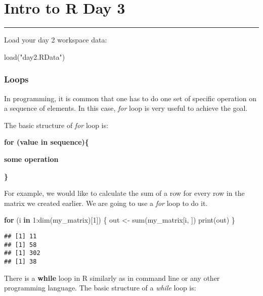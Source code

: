 \documentclass[
]{article}
\author{}
\date{\vspace{-2.5em}}
\newenvironment{Shaded}{\begin{snugshade}}{\end{snugshade}}
\newcommand{\ControlFlowTok}[1]{\textcolor[rgb]{0.13,0.29,0.53}{\textbf{#1}}}
\newcommand{\DecValTok}[1]{\textcolor[rgb]{0.00,0.00,0.81}{#1}}
\newcommand{\FunctionTok}[1]{\textcolor[rgb]{0.00,0.00,0.00}{#1}}
\newcommand{\NormalTok}[1]{#1}
\newcommand{\OtherTok}[1]{\textcolor[rgb]{0.56,0.35,0.01}{#1}}
\newcommand{\SpecialCharTok}[1]{\textcolor[rgb]{0.00,0.00,0.00}{#1}}
\newcommand{\StringTok}[1]{\textcolor[rgb]{0.31,0.60,0.02}{#1}}
\begin{document}
\hypertarget{intro-to-r-day-3}{%
\section{Intro to R Day 3}\label{intro-to-r-day-3}}

\begin{center}\rule{0.5\linewidth}{0.5pt}\end{center}

Load your day 2 workspace data:

\begin{Shaded}
\begin{Highlighting}[]
\FunctionTok{load}\NormalTok{(}\StringTok{"day2.RData"}\NormalTok{)}
\end{Highlighting}
\end{Shaded}

\hypertarget{loops}{%
\subsubsection{Loops}\label{loops}}

In programming, it is common that one has to do one set of specific
operation on a sequence of elements. In this case, \emph{for} loop is
very useful to achieve the goal.

The basic structure of \emph{for} loop is:

\textbf{for (value in sequence)\{}

\textbf{some operation}

\textbf{\}}

For example, we would like to calculate the sum of a row for every row
in the matrix we created earlier. We are going to use a \emph{for} loop
to do it.

\begin{Shaded}
\begin{Highlighting}[]
\ControlFlowTok{for}\NormalTok{ (i }\ControlFlowTok{in} \DecValTok{1}\SpecialCharTok{:}\FunctionTok{dim}\NormalTok{(my\_matrix)[}\DecValTok{1}\NormalTok{]) \{}
\NormalTok{  out }\OtherTok{\textless{}{-}} \FunctionTok{sum}\NormalTok{(my\_matrix[i, ])}
  \FunctionTok{print}\NormalTok{(out)}
\NormalTok{\}}
\end{Highlighting}
\end{Shaded}

\begin{verbatim}
## [1] 11
## [1] 58
## [1] 302
## [1] 38
\end{verbatim}

There is a \textbf{while} loop in R similarly as in command line or any
other programming language. The basic structure of a \emph{while} loop
is:
\end{document}
